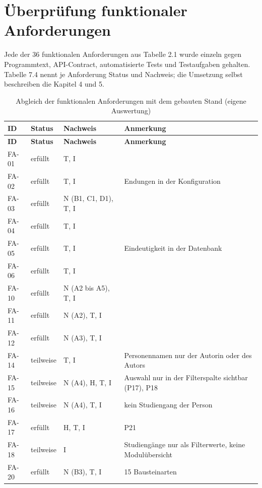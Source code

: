 \section{Überprüfung funktionaler Anforderungen}
\label{sec:ueberpruefung-fa}

Jede der 36 funktionalen Anforderungen aus Tabelle 2.1 wurde einzeln gegen Programmtext, API-Contract, automatisierte Tests und Testaufgaben gehalten. Tabelle 7.4 nennt je Anforderung Status und Nachweis; die Umsetzung selbst beschreiben die Kapitel 4 und 5.

\begingroup
\small
\setlength{\tabcolsep}{4pt}
\begin{longtable}{@{}L{1.4cm}L{1.9cm}L{3.4cm}L{6.9cm}@{}}
	\caption[Abgleich der funktionalen Anforderungen mit dem gebauten Stand]{Abgleich der funktionalen Anforderungen mit dem gebauten Stand (eigene Auswertung)}
	\label{tab:abgleich-fa}\\
	\toprule
	\textbf{ID} & \textbf{Status} & \textbf{Nachweis} & \textbf{Anmerkung} \\
	\midrule
	\endfirsthead
	\toprule
	\textbf{ID} & \textbf{Status} & \textbf{Nachweis} & \textbf{Anmerkung} \\
	\midrule
	\endhead
	\bottomrule
	\endfoot
	FA-01 & erfüllt & T, I & \\
	FA-02 & erfüllt & T, I & Endungen in der Konfiguration \\
	FA-03 & erfüllt & N (B1, C1, D1), T, I & \\
	FA-04 & erfüllt & T, I & \\
	FA-05 & erfüllt & T, I & Eindeutigkeit in der Datenbank \\
	FA-06 & erfüllt & T, I & \\
	FA-10 & erfüllt & N (A2 bis A5), T, I & \\
	FA-11 & erfüllt & N (A2), T, I & \\
	FA-12 & erfüllt & N (A3), T, I & \\
	FA-14 & teilweise & T, I & Personennamen nur der Autorin oder des Autors \\
	FA-15 & teilweise & N (A4), H, T, I & Auswahl nur in der Filterspalte sichtbar (P17), P18 \\
	FA-16 & teilweise & N (A4), T, I & kein Studiengang der Person \\
	FA-17 & erfüllt & H, T, I & P21 \\
	FA-18 & teilweise & I & Studiengänge nur als Filterwerte, keine Modulübersicht \\
	FA-20 & erfüllt & N (B3), T, I & 15 Bausteinarten \\

\end{longtable}
